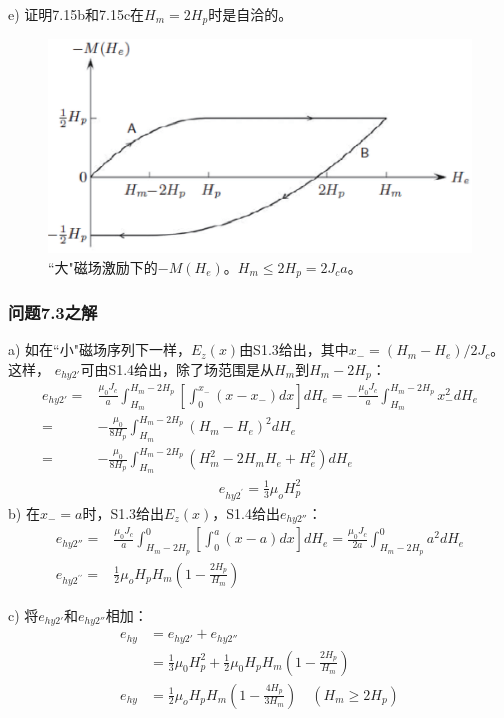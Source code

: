 e) 证明7.15b和7.15c在$H_m=2H_p$时是自洽的。

\begin{figure}[htbp]
	\centering
	\includegraphics[scale=0.7]{chpt7/figs/fig7.12.eps}
	\caption{``大"磁场激励下的$-M(H_e)$。$H_m\le 2H_p=2J_c a$。}
\end{figure}

\subsubsection{问题7.3之解}
a) 如在``小"磁场序列下一样，$E_z(x)$由S1.3给出，其中$x_-=(H_m-H_e)/2J_c$。这样，
$e_{hy2'}$可由S1.4给出，除了场范围是从$H_m$到$H_m-2H_p$：
\begin{align*}%
e_{hy2'}=&\frac{\mu_0 J_c}{a}\int_{H_m}^{H_m-2H_p}\left[\int_{0}^{x_-}(x-x_-)dx\right]dH_e=-\frac{\mu_0 J_c}{a}\int_{H_m}^{H_m-2H_p} x_-^2 dH_e\\
=&-\frac{\mu_0}{8H_p}\int_{H_m}^{H_m-2H_p}(H_m-H_e)^2 dH_e\\
=&-\frac{\mu_0}{8H_p}\int_{H_m}^{H_m-2H_p}(H_m^2-2H_mH_e+H_e^2) dH_e
\end{align*}
\begin{align*}
e_{hy2^\prime}=\frac{1}{3}\mu_oH_{p}^{2} \tag{7.16a}
\end{align*}
b) 在$x_-=a$时，S1.3给出$E_z(x)$，S1.4给出$e_{hy2''}$：
\begin{align*}%
e_{hy2''}=&\frac{\mu_0 J_c}{a}\int_{H_m-2H_p}^{0}\left[\int_{0}^{a}(x-a)dx\right]dH_e=\frac{\mu_0J_c}{2a}\int_{H_m-2H_p}^{0}a^2 dH_e\\
e_{hy2^{\prime\prime}}=&\frac{1}{2}\mu_oH_pH_m\left(1-\frac{2H_p}{H_m}\right) \tag{7.16b}
\end{align*}

c) 将$e_{hy2'}$和$e_{hy2''}$相加：
\begin{align*}%
e_{hy}&=e_{hy2'}+e_{hy2''}\\
&=\frac{1}{3}\mu_0 H_p^2 +\frac{1}{2}\mu_0H_p H_m\left(1-\frac{2H_p}{H_m}\right)\\
e_{hy}&=\frac{1}{2}\mu_oH_pH_m\left(1-\frac{4H_p}{3H_m}\right)  \quad   (H_m\geq 2H_p) \tag{7.14b}
\end{align*}

